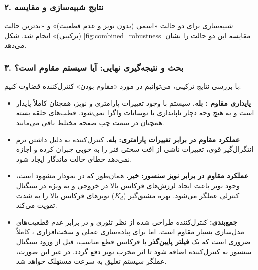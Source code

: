 \documentclass[a4paper]{article}
\begin{document}
\subsubsection*{۲. نتایج شبیه‌سازی و مقایسه}
شبیه‌سازی برای دو حالت «اسمی (بدون نویز و عدم قطعیت)» و «بدترین حالت (ترکیبی)» انجام شد. شکل \ref{fig:combined_robustness} مقایسه این دو حالت را نشان می‌دهد.


\subsubsection*{۳. بحث و نتیجه‌گیری نهایی: آیا سیستم مقاوم  است؟}
با بررسی نتایج ترکیبی، می‌توانیم در مورد «مقاوم بودن» کنترل‌کننده قضاوت کنیم:

\begin{itemize}
	\item \textbf{پایداری مقاوم : بله.} سیستم با وجود تغییرات پارامتری و نویز، همچنان کاملاً پایدار است و به هیچ وجه دچار ناپایداری یا نوسانات واگرا نمی‌شود. قطب‌های حلقه بسته همچنان در سمت چپ صفحه مختلط باقی می‌مانند.
	
	\item \textbf{عملکرد مقاوم  در برابر تغییرات پارامتری: بله.} کنترل‌کننده  به دلیل داشتن ترم انتگرال‌گیر قوی، تغییرات ناشی از افت سختی فنر را به خوبی جبران کرده و اجازه نمی‌دهد خطای حالت ماندگار ایجاد شود.
	
	\item \textbf{عملکرد مقاوم در برابر نویز سنسور: خیر.} همان‌طور که در نمودار مشهود است، وجود نویز باعث ایجاد لرزش‌های فرکانس بالا  در خروجی و به ویژه در سیگنال کنترلی عملگر می‌شود. بهره مشتق‌گیر ($K_d$) نویزهای فرکانس بالا را به شدت تقویت می‌کند.
	
	\item \textbf{جمع‌بندی:} کنترل‌کننده طراحی شده از نظر تئوری و در برابر عدم قطعیت‌های مدل‌سازی بسیار مقاوم است. اما برای پیاده‌سازی عملی و سخت‌افزاری ، کاملاً ضروری است که یک \textbf{فیلتر پایین‌گذر } با فرکانس قطع مناسب، قبل از ورود سیگنال سنسور به کنترل‌کننده اضافه شود تا اثر مخرب نویز دفع گردد. در غیر این صورت، عملگر سیستم تعلیق به سرعت مستهلک خواهد شد.
\end{itemize}
\end{document}

